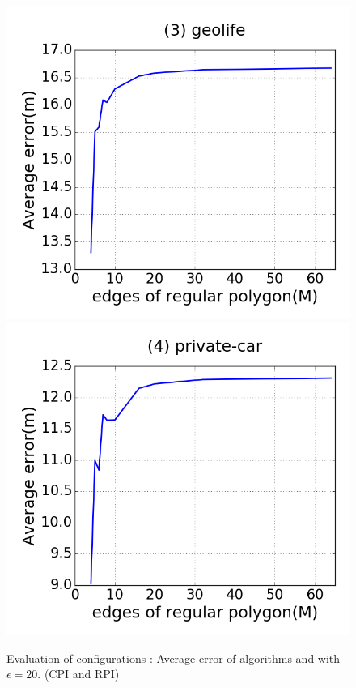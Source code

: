 \begin{figure}[tb!]
\includegraphics[scale = 0.250]{figures/Exp-M-error-geolife.png}
\includegraphics[scale = 0.250]{figures/Exp-M-error-private.png}
\vspace{-2ex}
\caption{\small Evaluation of configurations : Average error of algorithms \cist and \cista with $\epsilon = 20$. (CPI and RPI)}
\label{fig:m-error-e20}
\vspace{-1ex}
\end{figure}

